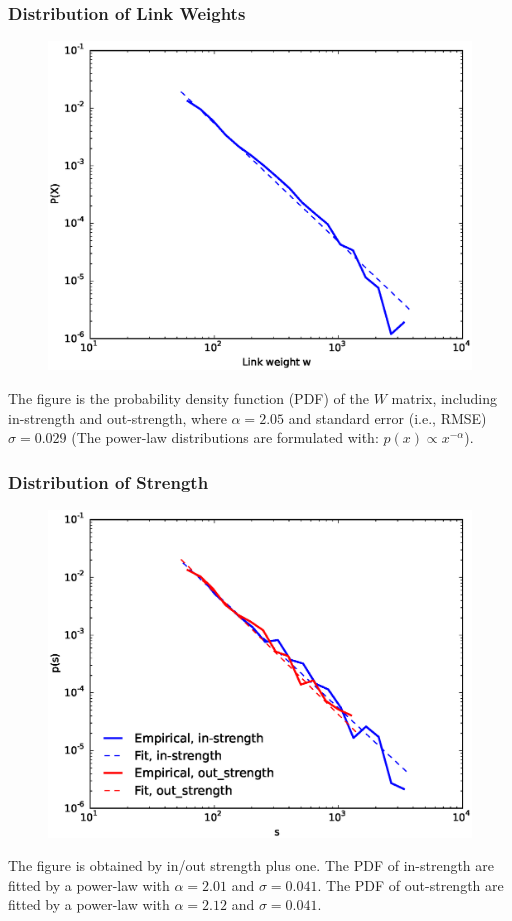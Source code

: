 \documentclass{beamer}
\begin{document}
\begin{frame}
\frametitle{Distribution of Link Weights}
\begin{figure}
\includegraphics[width=0.65\linewidth]{wpdf.eps}
\end{figure}
\small{The figure is the probability density function (PDF) of the $W$ matrix, including in-strength and out-strength, where $\alpha=2.05$ and standard error (i.e., RMSE) $\sigma= 0.029$ (The power-law distributions are formulated with: $p(x)\propto x^{-\alpha}$).}
\end{frame}





\begin{frame}
\frametitle{Distribution of Strength}
\begin{figure}
\includegraphics[width=0.65\linewidth]{strengthpdf.eps}
\end{figure}
\small{The figure is obtained by in/out strength plus one. The PDF of in-strength are fitted by a power-law with $\alpha=2.01$ and $\sigma=0.041$. The PDF of out-strength are fitted by a power-law with $\alpha=2.12$ and $\sigma=0.041$.
}
\end{frame}
\end{document}
